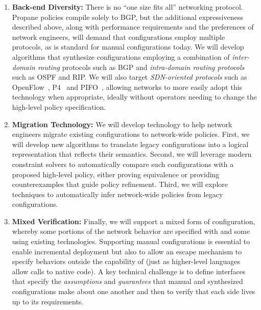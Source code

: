 \begin{enumerate}
\item {\bf Back-end Diversity:} There is no ``one size fits all'' networking protocol. Propane policies compile solely to BGP, but the additional expressiveness described above, along with performance requirements and the preferences of network engineers, will demand that configurations employ multiple protocols, as is standard for manual configurations today.  We will develop algorithms that synthesize configurations employing a combination of \emph{inter-domain routing} protocols such as BGP and \emph{intra-domain routing protocols} such as OSPF and RIP.  We will also target
\emph{SDN-oriented protocols} such as OpenFlow~\cite{openflow}, P4~\cite{P4} and PIFO~\cite{pifo}, allowing networks to more easily adopt this technology when appropriate, ideally 
without operators needing to change the high-level policy specification.

\item {\bf Migration Technology:} We will develop technology to help network engineers migrate existing configurations to network-wide policies.  First, we will develop new algorithms to translate legacy configurations into a logical
representation that reflects their semantics.  Second, we will leverage modern constraint solvers to automatically compare such configurations with a proposed high-level policy, either proving equivalence or providing counterexamples that guide policy refinement.  Third, we will explore techniques to automatically infer network-wide policies from legacy configurations.

\item {\bf Mixed Verification:} Finally, we will support a mixed form of configuration, whereby some portions of the network behavior are specified with \Name and some using existing technologies.  Supporting manual configurations is essential to enable incremental deployment but also to allow an escape mechanism to specify behaviors outside the capability of \Name (just as higher-level languages allow calls to native code).  A key technical challenge is to define interfaces that specify the \emph{assumptions} and \emph{guarantees} that manual and synthesized configurations make about one another and then to verify that each side lives up to its requirements. 
\end{enumerate}

